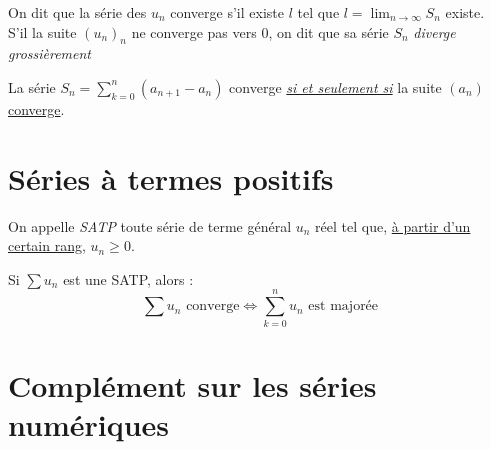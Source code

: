 \documentclass[11pt,a4paper,fleqn,pdftex]{report}
\begin{document}
\begin{dfn}
    On dit que la série des $u_n$ converge s'il existe $l$ tel que $l = \lim_{n\to \infty} S_n$ existe.\\
    S'il la suite $(u_n)_n$ ne converge pas vers $0$, on dit que sa série $S_n$ \emph{diverge grossièrement}
\end{dfn}
\begin{itheorem}
    La série $S_n = \sum_{k=0}^n (a_{n+1}-a_n)$ converge \emph{\uline{si et seulement si}} la suite $(a_n)$ \uline{converge}.
\end{itheorem}
\section{Séries à termes positifs} %
\label{sec:SATP}
\begin{dfn}
    On appelle \emph{\acrfull{SATP}} toute série de terme général $u_n$ réel tel que, \uline{à partir d'un certain rang}, $u_n \ge 0$.
\end{dfn}
\begin{itheorem}
    Si $\sum u_n$ est une \gls{SATP}, alors :
    \begin{equation}
        \sum u_n \text{ converge} \Leftrightarrow \sum_{k=0}^n u_n \text{ est majorée}
    \end{equation}
\end{itheorem}
\section{Complément sur les séries numériques} %
\label{sec:complement_sur_les_series_numeriques}
\end{document}
